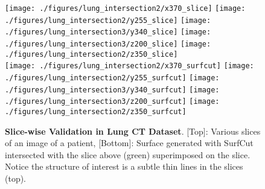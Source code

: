 \documentclass[10pt,journal,compsoc]{IEEEtran}
\newcommand{\comment}[1]{ }
\begin{document}
\comment{
\def\fHeightLI{1.2in}
\begin{figure}
  \centering
  \texttt{[image: ./figures/lung\_intersection2/x370\_slice]}
  \texttt{[image: ./figures/lung\_intersection2/x370\_surfcut]}
  \texttt{[image: ./figures/lung\_intersection2/3d\_001]} \\ \vspace{1mm}
  \texttt{[image: ./figures/lung\_intersection2/y255\_slice]}
  \texttt{[image: ./figures/lung\_intersection2/y255\_surfcut]}
  \texttt{[image: ./figures/lung\_intersection2/3d\_002]} \\ \vspace{1mm}
  \texttt{[image: ./figures/lung\_intersection2/z350\_slice]}
  \texttt{[image: ./figures/lung\_intersection2/z350\_surfcut]}
  \texttt{[image: ./figures/lung\_intersection2/3d\_003]}
  \caption{Validation on slices (first column) that intersect the
    surface computed with SurfCut (green, second column) passes
    through locations of high likelihood of the true surface (red regions).}
  \label{fig:lung-intersection}
\end{figure}
}

\def\fHeightLI{1.1in}
\begin{figure}
  \centering
  \texttt{[image: ./figures/lung\_intersection2/x370\_slice]}
  \texttt{[image: ./figures/lung\_intersection2/y255\_slice]}
  \texttt{[image: ./figures/lung\_intersection3/y340\_slice]}
  \texttt{[image: ./figures/lung\_intersection3/z200\_slice]}
  \texttt{[image: ./figures/lung\_intersection2/z350\_slice]}
\\ \vspace{1mm}
  \texttt{[image: ./figures/lung\_intersection2/x370\_surfcut]}
  \texttt{[image: ./figures/lung\_intersection2/y255\_surfcut]}
  \texttt{[image: ./figures/lung\_intersection3/y340\_surfcut]}
  \texttt{[image: ./figures/lung\_intersection3/z200\_surfcut]}
  \texttt{[image: ./figures/lung\_intersection2/z350\_surfcut]}
  \caption{ {\bf Slice-wise Validation in Lung CT Dataset}. [Top]:
    Various slices of an image of a patient, [Bottom]: Surface
    generated with SurfCut intersected with the slice above (green)
    superimposed on the slice. Notice the structure of interest is a
    subtle thin lines in the slices (top).}
  \label{fig:lung-intersection}
\end{figure}
\end{document}
